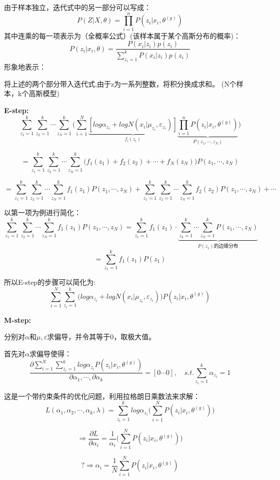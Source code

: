 \documentclass[UTF8]{ctexart} %
\begin{document}
			由于样本独立，迭代式中的另一部分可以写成：
			\[P(Z|X,\theta) = \prod_{i=1}^nP(z_i|x_i,\theta^{(g)})\]
			其中连乘的每一项表示为（全概率公式）(该样本属于某个高斯分布的概率)：
			\[P(z_i|x_i,\theta)  = \frac{P(x_i|z_i)p(z_i)}{\sum_{z_{i}=1}^kP(x_i|z_i)p(z_i)}\]
			形象地表示：
			\begin{figure}[H]
			\end{figure}		
			将上述的两个部分带入迭代式,由于z为一系列整数，将积分换成求和。
			(N个样本，k个高斯模型)
			
			\textbf{E-step:}
			\[\sum_{z_1=1}^k\sum_{z_2=1}^k\cdots\sum_{z_N=1}^k\bigg(\sum_{i=1}^N
			\underbrace{[log\alpha_{z_i}+logN(x_i|\mu_{z_i},\varepsilon_{z_i})]}_{f_i(z_i)}
			\underbrace{\prod_{i=1}^nP(z_i|x_i,\theta^{(g)})}_{P(z_1,\cdots,z_N)}\bigg)\]
			
			\[=\sum_{z_1=1}^k\sum_{z_2=1}^k\cdots\sum_{z_N=1}^k\Big(f_1(z_1)+f_2(z_2)+\cdots +f_N(z_N)\Big)P(z_1,\cdots,z_N)\]
			
			\[=\sum_{z_1=1}^k\sum_{z_2=1}^k\cdots\sum_{z_N=1}^kf_1(z_1)P(z_1,\cdots,z_N)+\sum_{z_1=1}^k\sum_{z_2=1}^k\cdots\sum_{z_N=1}^kf_2(z_2)P(z_1,\cdots,z_N)+\cdots\]
			
			以第一项为例进行简化：
			\[\sum_{z_1=1}^k\sum_{z_2=1}^k\cdots\sum_{z_N=1}^kf_1(z_1)P(z_1,\cdots,z_N) = \sum_{z_1=1}^kf_1(z_1)\cdot \underbrace{\sum_{z_2=1}^k\cdots\sum_{z_N=1}^kP(z_1,\cdots,z_N)}_{P(z_1)\text{的边缘分布}}\]
			\[=\sum_{z_1=1}^kf_1(z_1)P(z_1)\]
			
			所以E-step的步骤可以简化为: 
			\[\sum_{i=1}^N\sum_{z_i=1}^k\Big(log\alpha_{z_i}+logN(x_i|\mu_{z_i},\varepsilon_{z_i})\Big) P(z_i|x_i,\theta^{(g)})\]
			
			\textbf{M-step:}
			
			分别对$\alpha$和$\mu,\varepsilon$求偏导，并令其等于0，取极大值。
			
			首先对$\alpha$求偏导使得：
			\[\frac{\partial\sum_{i=1}^N\sum_{z_i=1}^klog\alpha_{z_i}P(z_i|x_i,\theta^{(g)})}{\partial\alpha_1,\cdots,\partial\alpha_k} = [0\cdots0],\quad s.t.\sum_{z_i=1}^k\alpha_{z_i}=1\]
			
			这是一个带约束条件的优化问题，利用拉格朗日乘数法来求解：
			\[L(\alpha_1,\alpha_2,\cdots,\alpha_k,\lambda) = \sum_{z_i=1}^klog\alpha_{z_i}\Bigg(\sum_{i=1}^NP(z_i|x_i,\theta^{(g)})\Bigg)\]
			
			\[\Longrightarrow \frac{\partial L}{\partial\alpha_i}  = \frac{1}{\alpha_i}\Bigg(\sum_{i=1}^NP(z_i|x_i,\theta^{(g)})\Bigg) \]
							
			\[?\Longrightarrow \alpha_i = \frac{1}{N}\sum_{i=1}^NP(z_i|x_i,\theta^{(g)})\]
			
			
			
				
			
		
			
			
\end{document}
